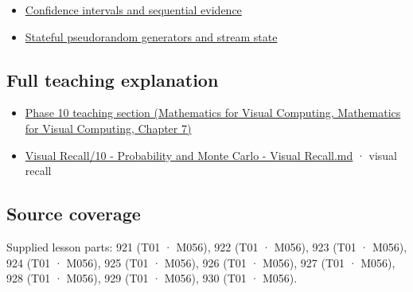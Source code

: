 \begin{itemize}
\tightlist
\item
  \hyperref[appendix-c83016554b1e]{Confidence intervals and sequential evidence}
\item
  \hyperref[appendix-e0f7c7e08f3a]{Stateful pseudorandom generators and stream state}
\end{itemize}

\subsection{Full teaching explanation}\label{appendix-a2360b435383-full-teaching-explanation}

\begin{itemize}
\tightlist
\item
  \href{../02-Mathematics-for-Visual-Computing/main.pdf\#nameddest=02-foundations-ii-ch023-discrete-and-continuous-distribution-families}{Phase 10 teaching section (Mathematics for Visual Computing, Mathematics for Visual Computing, Chapter 7)}
\item
  \hyperref[appendix-cb5af353ef77]{Visual Recall/10 - Probability and Monte Carlo - Visual Recall.md} · visual recall
\end{itemize}

\subsection{Source coverage}\label{appendix-a2360b435383-source-coverage}

Supplied lesson parts: 921 (T01 · M056), 922 (T01 · M056), 923 (T01 · M056), 924 (T01 · M056), 925 (T01 · M056), 926 (T01 · M056), 927 (T01 · M056), 928 (T01 · M056), 929 (T01 · M056), 930 (T01 · M056).
